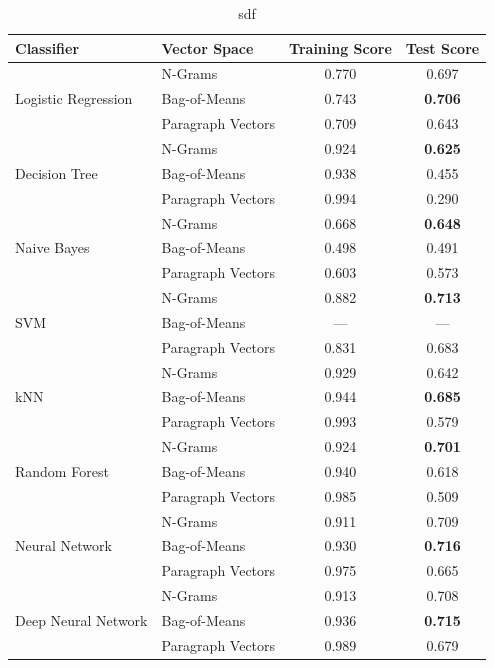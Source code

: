 \begin{table}[h]
  \begin{center}
    \begin{tabular}{ ll cc }
      \toprule
      Classifier & Vector Space & Training Score & Test Score \\
      \midrule
      \multirow{3}{*}{Logistic Regression}
       & N-Grams & 0.770 & 0.697 \\
       & Bag-of-Means & 0.743 & \textbf{0.706} \\
       & Paragraph Vectors & 0.709 & 0.643 \\
      \midrule
      \multirow{3}{*}{Decision Tree}
       & N-Grams & 0.924 & \textbf{0.625} \\
       & Bag-of-Means & 0.938 & 0.455 \\
       & Paragraph Vectors & 0.994 & 0.290 \\
      \midrule
      \multirow{3}{*}{Naive Bayes}
       & N-Grams & 0.668 & \textbf{0.648} \\
       & Bag-of-Means & 0.498 & 0.491 \\
       & Paragraph Vectors & 0.603 & 0.573 \\
      \midrule
      \multirow{3}{*}{SVM}
       & N-Grams & 0.882 & \textbf{0.713} \\
       & Bag-of-Means & --- & --- \\
       & Paragraph Vectors & 0.831 & 0.683 \\
      \midrule
      \multirow{3}{*}{kNN}
       & N-Grams & 0.929 & 0.642 \\
       & Bag-of-Means & 0.944 & \textbf{0.685} \\
       & Paragraph Vectors & 0.993 & 0.579 \\
      \midrule
      \multirow{3}{*}{Random Forest}
       & N-Grams & 0.924 & \textbf{0.701} \\
       & Bag-of-Means & 0.940 & 0.618 \\
       & Paragraph Vectors & 0.985 & 0.509 \\
      \midrule
      \multirow{3}{*}{Neural Network}
       & N-Grams & 0.911 & 0.709 \\
       & Bag-of-Means & 0.930 & \textbf{0.716} \\
       & Paragraph Vectors & 0.975 & 0.665 \\
      \midrule
      \multirow{3}{*}{Deep Neural Network}
       & N-Grams & 0.913 & 0.708 \\
       & Bag-of-Means & 0.936 & \textbf{0.715} \\
       & Paragraph Vectors & 0.989 & 0.679 \\
      \bottomrule
    \end{tabular}
  \caption{sdf}
\label{tab:Paragraph Vector Parameter Hyper-Parameter Results}
\end{center}
\end{table}


